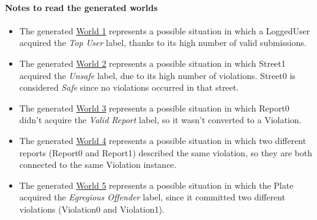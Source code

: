 \clearpage

\paragraph{Notes to read the generated worlds}
	\begin{itemize}
		\item The generated \hyperref[fig:World1]{World 1} represents a possible situation in which a LoggedUser acquired the \emph{Top User} label, thanks to its high number of valid submissions.
		
		\item The generated \hyperref[fig:World2]{World 2} represents a possible situation in which Street1 acquired the \emph{Unsafe} label, due to its high number of violations. Street0 is considered \emph{Safe} since no violations occurred in that street.
		
		\item The generated \hyperref[fig:World3]{World 3} represents a possible situation in which Report0 didn't acquire the \emph{Valid Report} label, so it wasn't converted to a Violation.
		
		\item The generated \hyperref[fig:World4]{World 4} represents a possible situation in which two different reports (Report0 and Report1) described the same violation, so they are both connected to the same Violation instance.
		
		\item The generated \hyperref[fig:World5]{World 5} represents a possible situation in which the Plate acquired the \emph{Egregious Offender} label, since it committed two different violations (Violation0 and Violation1).
	\end{itemize}